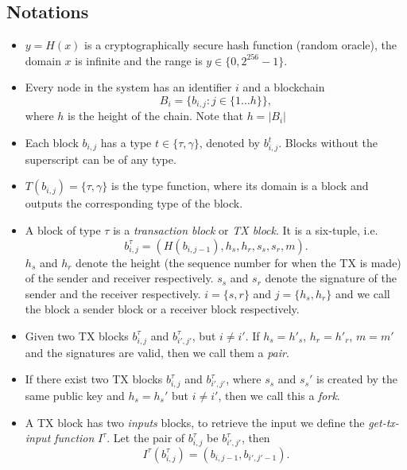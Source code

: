\subsection{Notations}
\begin{itemize}

\item $y = H(x)$ is a cryptographically secure hash function (random oracle),
  the domain $x$ is infinite and the range is $y \in \{0, 2^{256}-1\}$.

\item Every node in the system has an identifier $i$ and a blockchain
  $$B_i = \{b_{i,j} : j \in \{1 \dots h\} \},$$
  where $h$ is the height of the chain. Note that $h = |B_i|$

\item Each block $b_{i,j}$ has a type $t \in \{ \tau, \gamma \}$, denoted by
  $b^t_{i,j}$. Blocks without the superscript can be of any type.

\item $T(b_{i, j}) = \{ \tau, \gamma \}$ is the type function, where its domain
  is a block and outputs the corresponding type of the block.

\item A block of type $\tau$ is a \emph{transaction block} or \emph{TX block}.
  It is a six-tuple, i.e. $$b^\tau_{i,j} = (H(b_{i,j-1}), h_s, h_r, s_s, s_r,
  m).$$ $h_s$ and $h_r$ denote the height (the sequence number for when the TX
  is made) of the sender and receiver respectively. $s_s$ and $s_r$ denote the
  signature of the sender and the receiver respectively. $i = \{s, r\}$ and $j =
  \{h_s, h_r\}$ and we call the block a sender block or a receiver block
  respectively.

\item Given two TX blocks $b^\tau_{i,j}$ and $b^\tau_{i',j'}$, but $i \neq i'$.
  If $h_s = h'_s$, $h_r = h'_r$, $m = m'$ and the signatures are valid, then we
  call them a \emph{pair}.

\item If there exist two TX blocks $b^\tau_{i,j}$ and $b^\tau_{i',j'}$, where
  $s_s$ and $s_s'$ is created by the same public key and $h_s = h_s'$ but $i
  \neq i'$, then we call this a \emph{fork}.

\item A TX block has two \emph{inputs} blocks, to retrieve the input we define
  the \emph{get-tx-input function} $I^\tau$. Let the pair of $b^\tau_{i,j}$ be
  $b^\tau_{i',j'}$, then
  $$I^\tau(b^\tau_{i,j}) = (b_{i, j-1}, b_{i', j'-1}).$$


\end{itemize}
